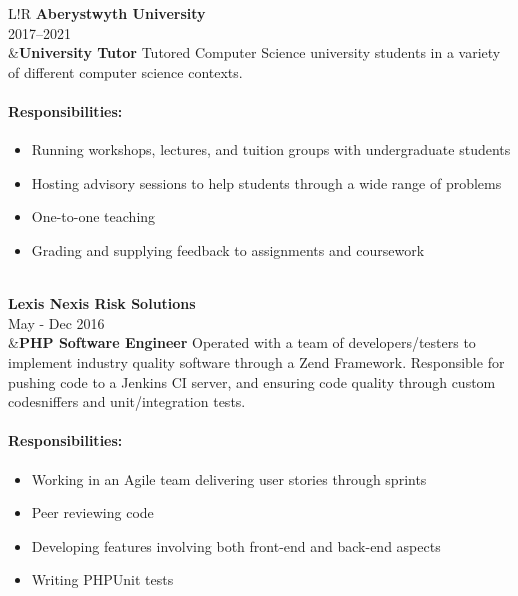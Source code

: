 \documentclass[10pt]{article}
\newcommand\VRule{\color{lightgray}\vrule width 0.5pt}
\begin{document}
\begin{longtable}{L!{\VRule}R}
{\bf Aberystwyth University}\\
2017--2021\\
&{\bf University Tutor}\newline
Tutored Computer Science university students in a variety of different computer science contexts.

\vspace{-3mm}
\paragraph{Responsibilities:}
\begin{itemize}[noitemsep,topsep=0pt]
	\item Running workshops, lectures, and tuition groups with undergraduate students
	\item Hosting advisory sessions to help students through a wide range of problems
	\item One-to-one teaching
	\item Grading and supplying feedback to assignments and coursework
\end{itemize}
\\

{\bf Lexis Nexis Risk Solutions}\\
May - Dec 2016\\
&{\bf PHP Software Engineer}\newline
Operated with a team of developers/testers to implement industry quality software through a Zend Framework. Responsible for pushing code to a Jenkins CI server, and ensuring code quality through custom codesniffers and unit/integration tests.

\vspace{-3mm}
\paragraph{Responsibilities:}
\begin{itemize}[noitemsep,topsep=0pt]
    \item Working in an Agile team delivering user stories through sprints
    \item Peer reviewing code
    \item Developing features involving both front-end and back-end aspects
    \item Writing PHPUnit tests
\end{itemize}
\end{longtable}

\end{document}
